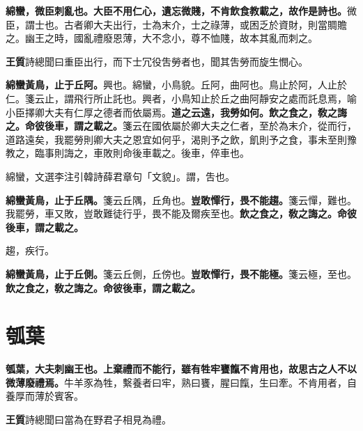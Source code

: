 
\textbf{綿蠻，微臣刺亂也。大臣不用仁心，遺忘微賤，不肯飲食教載之，故作是詩也。}{\footnotesize 微臣，謂士也。古者卿大夫出行，士為末介，士之祿薄，或困乏於資財，則當賙贍之。幽王之時，國亂禮廢恩薄，大不念小，尊不恤賤，故本其亂而刺之。}

\begin{quoting}\textbf{王質}詩總聞曰重臣出行，而下士冗役吿勞者也，聞其吿勞而旋生憫心。\end{quoting}

\textbf{綿蠻黃鳥，止于丘阿。}{\footnotesize 興也。綿蠻，小鳥貌。丘阿，曲阿也。鳥止於阿，人止於仁。箋云止，謂飛行所止託也。興者，小鳥知止於丘之曲阿靜安之處而託息焉，喻小臣擇卿大夫有仁厚之德者而依屬焉。}\textbf{道之云遠，我勞如何。飲之食之，敎之誨之。命彼後車，謂之載之。}{\footnotesize 箋云在國依屬於卿大夫之仁者，至於為末介，從而行，道路遠矣，我罷勞則卿大夫之恩宜如何乎，渴則予之飲，飢則予之食，事未至則豫教之，臨事則誨之，車敗則命後車載之。後車，倅車也。}

\begin{quoting}綿蠻，文選李注引韓詩薛君章句「文貌」。謂，吿也。\end{quoting}

\textbf{綿蠻黃鳥，止于丘隅。}{\footnotesize 箋云丘隅，丘角也。}\textbf{豈敢憚行，畏不能趨。}{\footnotesize 箋云憚，難也。我罷勞，車又敗，豈敢難徒行乎，畏不能及爾疾至也。}\textbf{飲之食之，敎之誨之。命彼後車，謂之載之。}

\begin{quoting}趨，疾行。\end{quoting}

\textbf{綿蠻黃鳥，止于丘側。}{\footnotesize 箋云丘側，丘傍也。}\textbf{豈敢憚行，畏不能極。}{\footnotesize 箋云極，至也。}\textbf{飲之食之，敎之誨之。命彼後車，謂之載之。}

\section{瓠葉}


\textbf{瓠葉，大夫刺幽王也。上棄禮而不能行，雖有牲牢饔餼不肯用也，故思古之人不以微薄廢禮焉。}{\footnotesize 牛羊豕為牲，繫養者曰牢，熟曰饔，腥曰餼，生曰牽。不肯用者，自養厚而薄於賓客。}

\begin{quoting}\textbf{王質}詩總聞曰當為在野君子相見為禮。\end{quoting}

